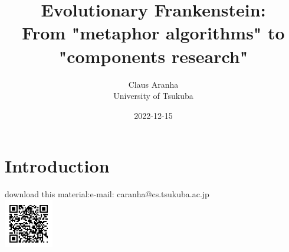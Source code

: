 \documentclass[aspectratio=169]{beamer}
\title[Evolutionary Frankenstein]{Evolutionary Frankenstein:\\ From "metaphor algorithms" to "components research"}
\author[Claus Aranha]{Claus Aranha\\University of Tsukuba}
\date{2022-12-15}
\begin{document}
\section{Introduction}
\begin{frame}
  \maketitle

  \footnotesize{download this material:}\hfill\footnotesize{e-mail: caranha@cs.tsukuba.ac.jp}\\
  \includegraphics[width=0.16\textwidth]{img/link.png}
\end{frame}
\end{document}
